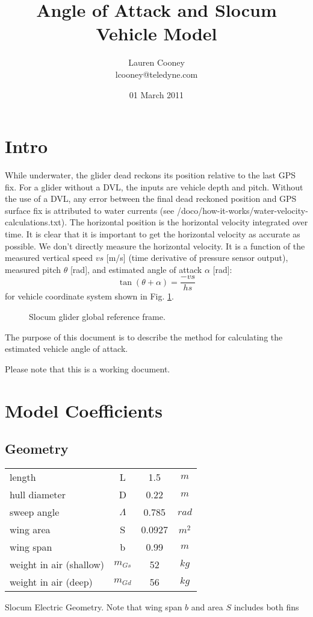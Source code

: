 \documentclass[10pt]{article}
\begin{document}
\title{Angle of Attack and Slocum Vehicle Model}
\date{01 March 2011}
\author{Lauren Cooney\\ lcooney@teledyne.com}
\maketitle
\section{Intro}
While underwater, the glider dead reckons its position relative to the last GPS fix.  For a glider without a DVL, the inputs are vehicle depth and pitch.  Without the use of a DVL, any error between the final dead reckoned position and GPS surface fix is attributed to water currents (see /doco/how-it-works/water-velocity-calculations.txt).  The horizontal position is the horizontal velocity integrated over time.  It is clear that it is important to get the horizontal velocity as accurate as possible.  We don't directly measure the horizontal velocity.  It is a function of the measured vertical speed $vs$ [m/s] (time derivative of pressure sensor output), measured pitch $\theta$ [rad], and estimated angle of attack $\alpha$ [rad]:
\begin{equation}
\tan{(\theta+\alpha)} = \frac{-vs}{hs}
\end{equation}  
for vehicle coordinate system shown in Fig. \ref{fig:coords}.  
      \begin{figure}[htb]
        \caption{\label{fig:coords} Slocum glider global reference frame.}
      \end{figure}

The purpose of this document is to describe the method for calculating the estimated vehicle angle of attack.

Please note that this is a working document.  

\section{Model Coefficients}
\subsection{Geometry}
\begin{center}
\begin{tabular}{lccc}
\hline
\hline
length & L & 1.5 & $m$\\
hull diameter & D & 0.22 & $m$ \\
sweep angle & $\Lambda$ & 0.785 & $rad$\\
wing area & S & 0.0927  & $m^2$\\
wing span & b &0.99 &$m$\\
weight in air (shallow) & $m_{Gs}$ & 52 &$kg$\\
weight in air (deep) & $m_{Gd}$ & 56 & $kg$\\
\hline
\end{tabular}
\end{center} 
Slocum Electric Geometry.  Note that wing span $b$ and area $S$ includes both fins 
\end{document}
